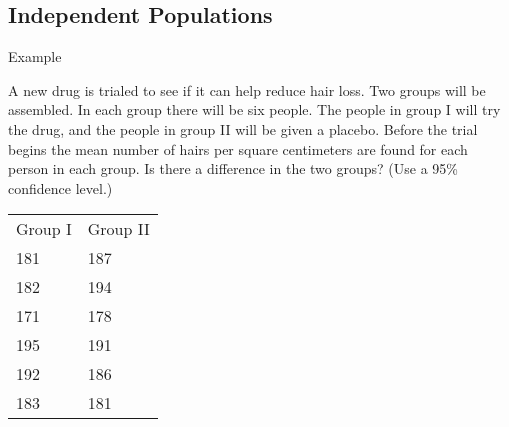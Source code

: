 



\subsection{Independent Populations}


\begin{frame}{Example}


    A new drug is trialed to see if it can help reduce hair loss. Two
    groups will be assembled. In each group there will be six people.
    The people in group I will try the drug, and the people in group
    II will be given a placebo. Before the trial begins the mean number of
    hairs per square centimeters are found for each person in each
    group. Is there a difference in the two groups? (Use a 95\% confidence
    level.)

    \begin{tabular}{ll}
      Group I & Group II \\
      181 & 187 \\
      182 & 194 \\
      171 & 178 \\
      195 & 191 \\
      192 & 186 \\
      183 & 181
    \end{tabular}

    \vfill 


    \vfill


\end{frame}


